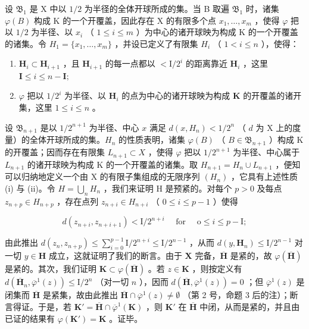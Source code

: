 设 \(\mathfrak{B}_1\) 是 X 中以 \(1/2\) 为半径的全体开球所成的集。当 B 取遍 \(\mathfrak{B}_1\) 时，诸集 \(\varphi(B)\) 构成 K 的一个开覆盖，因此存在 X 的有限多个点 \(x_1, \ldots, x_m\) ，使得 \(\varphi\) 把以 \(1/2\) 为半径、以 \(x_i\) （ \(1 \leqslant i \leqslant m\) ）为中心的诸开球映为构成 K 的一个开覆盖的诸集。令 \(H_1 = \{x_1, \ldots, x_m\}\) ，并设已定义了有限集 \(H_i\) （ \(1 < i \leqslant n\) ），使得：

\begin{enumerate}
\def\labelenumi{(\roman{enumi})}
\item
  \(\mathbf{H}_i\subset \mathbf{H}_{i + 1}\) ，且 \(\mathbf{H}_{i + 1}\) 的每一点都以 \(<  \mathrm{I} / 2^{i}\) 的距离靠近 \(\mathbf{H}_i\) ，这里 \(\mathbf{I}\leqslant i\leqslant n - \mathbf{I};\)
\item
  \(\varphi\) 把以 \(1/2^i\) 为半径、以 \(\mathbf{H}_i\) 的点为中心的诸开球映为构成 \(\mathbf{K}\) 的开覆盖的诸开集，这里 \(1 \leqslant i \leqslant n\) 。
\end{enumerate}

设 \(\mathfrak{B}_{n+1}\) 是以 \(1/2^{n+1}\) 为半径、中心 \(x\) 满足 \(d(x, H_n) < 1/2^n\) （ \(d\) 为 X 上的度量）的全体开球所成的集。\(H_n\) 的性质表明，诸集 \(\varphi(B)\) （ \(B \in \mathfrak{B}_{n+1}\) ）构成 K 的开覆盖；因而存在有限集 \(L_{n+1} \subset X\) ，使得 \(\varphi\) 把以 \(1/2^{n+1}\) 为半径、中心属于 \(L_{n+1}\) 的诸开球映为构成 K 的一个开覆盖的诸集。取 \(H_{n+1} = H_n \cup L_{n+1}\) ，便知可以归纳地定义一个由 X 的有限子集组成的无限序列 \((H_n)\) ，它具有上述性质 (i) 与 (ii)。令 \(H = \bigcup_{n} H_n\) ，我们来证明 H 是预紧的。对每个 \(p > 0\) 及每点 \(z_{n+p} \in H_{n+p}\) ，存在点列 \(z_{n+i} \in H_{n+i}\) （ \(0 \leqslant i \leqslant p - 1\) ）使得

\[
d \left(z _ {n + i}, z _ {n + i + 1}\right) <   \mathrm{I} / 2 ^ {n + i} \quad \text { for } \quad \mathrm{o} \leqslant i \leqslant p - \mathrm{I};
\]

由此推出 \(d(z_n, z_{n+p}) \leqslant \sum_{i=0}^{p-1} \mathrm{I}/2^{n+i} \leqslant \mathrm{I}/2^{n-1}\) ，从而 \(d(y, \mathbf{H}_n) \leqslant \mathrm{I}/2^{n-1}\) 对一切 \(y \in \mathbf{H}\) 成立，这就证明了我们的断言。由于 \(\mathbf{X}\) 完备，\(\overline{\mathbf{H}}\) 是紧的，故 \(\varphi(\overline{\mathbf{H}})\) 是紧的。其次，我们证明 \(\mathbf{K} \subset \varphi(\overline{\mathbf{H}})\) 。若 \(z \in \mathbf{K}\) ，则按定义有 \(d(\overline{\mathbf{H}}_n, \overline{\varphi}^1(z)) \leqslant \mathrm{I}/2^n\) （对一切 \(n\) ），因而 \(d(\overline{\mathbf{H}}, \overline{\varphi}^1(z)) = 0\) ；但 \(\overline{\varphi}^1(z)\) 是闭集而 \(\overline{\mathbf{H}}\) 是紧集，故由此推出 \(\overline{\mathbf{H}} \cap \overline{\varphi}^1(z) \neq \emptyset\) （第 2 号，命题 3 后的注）；断言得证。于是，若 \(\mathbf{K}' = \overline{\mathbf{H}} \cap \overline{\varphi}^1(\mathbf{K})\) ，则 \(\mathbf{K}'\) 在 \(\overline{\mathbf{H}}\) 中闭，从而是紧的，并且由已证的结果有 \(\varphi(\mathbf{K}') = \mathbf{K}\) 。证毕。

